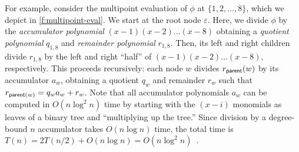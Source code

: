 For example, consider the multipoint evaluation of $\phi$ at $\{1,2,\dots,8\}$, which we depict in \cref{f:multipoint-eval}.
We start at the root node $\varepsilon$.
Here, we divide $\phi$ by the \textit{accumulator polynomial} $(x-1)(x-2)\dots(x-8)$ obtaining a \textit{quotient polynomial} $q_{1,8}$ and \textit{remainder polynomial} $r_{1,8}$.
Then, its left and right children divide $r_{1,8}$ by the left and right ``half'' of $(x-1)(x-2)\dots(x-8)$, respectively.
This proceeds recursively: each node $w$ divides $r_{\mathsf{parent}}(w)$ by its accumulator $a_w$, obtaining a quotient $q_w$ and remainder $r_w$ such that $r_{\mathsf{parent}(w)} = q_w a_w + r_w$.
Note that all accumulator polynomials $a_w$ can be computed in $O(n\log^2{n})$ time by starting with the $(x-i)$ monomials as leaves of a binary tree and ``multiplying up the tree.''
Since division by a degree-bound $n$ accumulator takes $O(n\log{n})$ time, the total time is $T(n)=2T(n/2)+O(n\log{n}) = O(n\log^2{n})$~\cite{vG13ModernCh10}.
